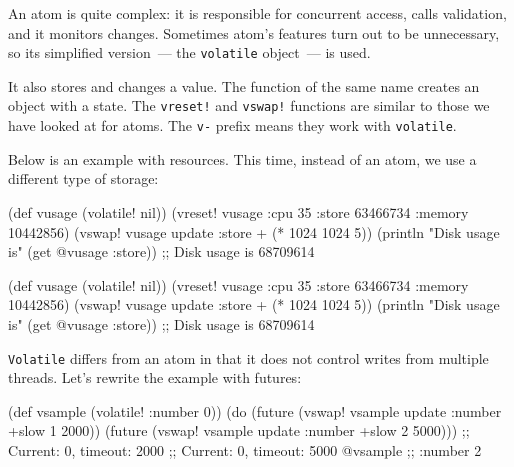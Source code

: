 An atom is quite complex: it is responsible for concurrent access, calls validation, and it monitors changes. Sometimes atom's features turn out to be unnecessary, so its simplified version~--- the \verb|volatile| object~--- is used.


It also stores and changes a value.
The function of the same name creates an object with a state.
The \verb|vreset!| and \verb|vswap!| functions are similar to those we have looked at for atoms.
The \verb|v-| prefix means they work with \verb|volatile|.

Below is an example with resources. This time, instead of an atom, we use a different type of storage:

\ifx\DEVICETYPE\MOBILE

\begin{english}
  \begin{clojure}
(def vusage (volatile! nil))
(vreset! vusage
         {:cpu 35
          :store 63466734
          :memory 10442856})
(vswap! vusage
  update :store + (* 1024 1024 5))
(println
  "Disk usage is" (get @vusage :store))
;; Disk usage is 68709614
  \end{clojure}
\end{english}

\else

\begin{english}
  \begin{clojure}
(def vusage (volatile! nil))
(vreset! vusage
         {:cpu 35
          :store 63466734
          :memory 10442856})
(vswap! vusage update :store + (* 1024 1024 5))
(println "Disk usage is" (get @vusage :store))
;; Disk usage is 68709614
  \end{clojure}
\end{english}

\fi

\verb|Volatile| differs from an atom in that it does not control writes from multiple threads.
Let's rewrite the example with futures:

\ifx\DEVICETYPE\MOBILE

\begin{english}
  \begin{clojure}
(def vsample (volatile! {:number 0}))
(do (future (vswap! vsample update
              :number +slow 1 2000))
    (future (vswap! vsample update
              :number +slow 2 5000)))
;; Current: 0, timeout: 2000
;; Current: 0, timeout: 5000
@vsample ;; {:number 2}
  \end{clojure}
\end{english}

